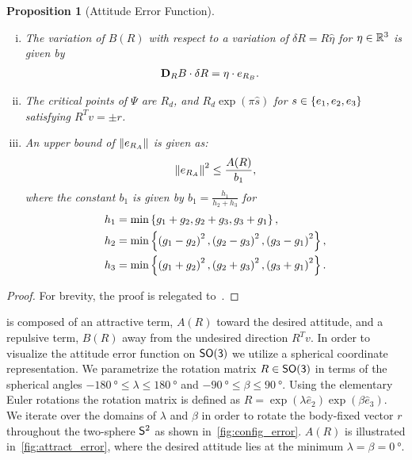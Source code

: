 \documentclass[letterpaper, 10 pt, conference]{ieeeconf}  %
\newtheorem{prop}{Proposition}
\begin{document}
\begin{prop}[Attitude Error Function]
\begin{enumerate}[(i)]
	\begin{align}
		\dirDiff{A}{R} &= \eta \cdot e_{R_A} .
	\end{align}
	\item \label{item:prop_erb} The variation of \( B(R) \) with respect to a variation of \( \delta R = R \hat{\eta} \) for \( \eta \in \R^3 \) is given by
	\begin{align}
		\dirDiff{B}{R} &= \eta \cdot e_{R_{B}} .
	\end{align}
	\item \label{item:prop_crit}The critical points of \( \Psi \) are $R_d$, and $R_d \exp(\pi \hat{s})$ for $s \in \braces{e_1, e_2, e_3}$ satisfying $R^T v = \pm r$.
	\item \label{item:prop_era_upbound}An upper bound of \( \norm{e_{R_A}} \) is given as:
	\begin{align}
		\norm{e_{R_A}}^2 \leq \frac{A(R)}{b_1} , \label{eqn:psi_lower_bound}
	\end{align}
	where the constant \( b_1 \) is given by \( b_1 = \frac{h_1}{h_2 + h_3} \) for 
	\begin{align*}
		h_1 &= \min\braces{g_1 + g_2, g_2 + g_3 , g_3 + g_1} ,\\
		h_2 &= \min\braces{\parenth{g_1 -g_2}^2,\parenth{g_2 -g_3}^2 , \parenth{g_3 -g_1}^2} ,\\
		h_3 &= \min\braces{\parenth{g_1 + g_2}^2, \parenth{g_2 + g_3}^2 , \parenth{g_3 + g_1}^2}.		
	\end{align*}
\end{enumerate}
\end{prop}
\begin{proof}
For brevity, the proof is relegated to~\cite{kulumani2016b}.
\end{proof}

 is composed of an attractive term, \( A (R) \) toward the desired attitude, and a repulsive term, \( B(R) \) away from the undesired direction \( R^T v \).
In order to visualize the attitude error function on \( \SO \) we utilize a spherical coordinate representation.
We parametrize the rotation matrix \( R \in \SO \) in terms of the spherical angles \( \SI{-180}{\degree} \leq \lambda \leq \SI{180}{\degree}  \) and \( \SI{-90}{\degree} \leq \beta \leq \SI{90}{\degree} \). 
Using the elementary Euler rotations the rotation matrix is defined as \( R = \exp( \lambda \hat{e}_2) \exp( \beta \hat{e}_3) \).
We iterate over the domains of \( \lambda\) and \(\beta\) in order to rotate the body-fixed vector \( r \) throughout the two-sphere \( \S^2 \) as shown in~\cref{fig:config_error}.
\( A(R)\) is illustrated in~\cref{fig:attract_error}, where the desired attitude lies at the minimum \(\lambda=\beta=\SI{0}{\degree}\).
\end{document}
